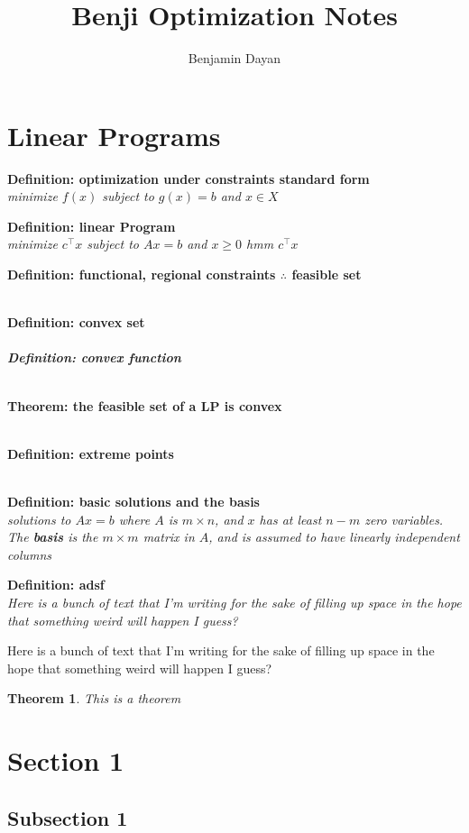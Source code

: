 \documentclass{tufte-handout}
\title{Benji Optimization Notes}
\author{Benjamin Dayan}
\newenvironment{defi}[1]
{\noindent \textbf{Definition: #1}\\
\itshape \noindent}
{\\}
\newenvironment{thm}[1]
{\noindent \textbf{Theorem: #1}\\
	\itshape \noindent}
{\\}
\newtheorem{theorem}{Theorem}
\begin{document}
	
	\maketitle
	
	\section{Linear Programs}
	\begin{defi}{optimization under constraints standard form}
		minimize $f(x)$ subject to $g(x) = b$ and $x \in X$
	\end{defi}
	
	\begin{defi}{linear Program}
		minimize $c^\intercal x$ subject to $Ax = b$ and $x \geq 0$ hmm $c^\intercal x$
	\end{defi}

	\begin{defi}{functional, regional constraints $\therefore$ feasible set}
	\end{defi}
	
	
	\begin{defi}{convex set}
	\end{defi}
	\begin{defi}{convex function}
	\end{defi}

	\begin{thm}{the feasible set of a LP is convex}
	\end{thm}

	\begin{defi}{extreme points}\end{defi}
	
	\begin{defi}{basic solutions and the basis}
		solutions to $Ax = b$ where $A$ is $m \times n$, and $x$ has at least $n-m$ zero variables. The \textbf{basis} is the $m \times m$ matrix in $A$, and is assumed to have linearly independent columns
	\end{defi}

	\begin{defi}{adsf}
		Here is a bunch of text that I'm writing for the sake of filling up space in the hope that something weird will happen I guess?
	\end{defi}
	

	Here is a bunch of text that I'm writing for the sake of filling up space in the hope that something weird will happen I guess?
		
	
	
	
	\begin{theorem}
		This is a theorem
	\end{theorem}
	
	
	\section{Section 1}
	
	
	\subsection{Subsection 1}
\end{document}
